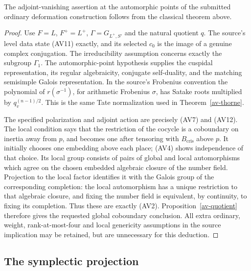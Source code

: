 \begin{corollary}\label{av-source}
The adjoint-vanishing assertion at the automorphic points of
the submitted ordinary deformation construction follows from
the classical theorem above.
\cite{alpo-uniform-source}
\end{corollary}
\begin{proof}
Use $F=L$, $F^+=L^+$, $\Gamma=G_{L^+,S'}$ and the
natural quotient $q$. The source's level data state (AV11)
exactly, and its selected $c_0$ is the image of a genuine
complex conjugation. The irreducibility assumption concerns
exactly the subgroup $\Gamma_1$. The automorphic-point
hypothesis supplies the cuspidal representation, its regular algebraicity,
conjugate self-duality, and the matching semisimple Galois
representation. In the source's Frobenius convention the
polynomial of $r(\sigma^{-1})$, for arithmetic Frobenius
$\sigma$, has Satake roots multiplied by
$q_v^{(n-1)/2}$. This is the same Tate normalization used
in Theorem~\ref{av-thorne}.

The specified polarization and adjoint action are precisely
(AV7) and (AV12). The local condition says that the
restriction of the cocycle is a coboundary on inertia away
from $p$, and becomes one after tensoring with
$B_{\mathrm{cris}}$ above $p$. It initially chooses one
embedding above each place; (AV4) shows independence of
that choice. Its local group consists of pairs of global
and local automorphisms which agree on the chosen embedded
algebraic closure of the number field. Projection to the
local factor identifies it with the Galois group of the
corresponding completion: the local automorphism has a
unique restriction to that algebraic closure, and fixing
the number field is equivalent, by continuity, to fixing
its completion. Thus these are exactly (AV2).
Proposition~\ref{av-quotient}
therefore gives the requested global coboundary conclusion.
All extra ordinary, weight, rank-at-most-four and local
genericity assumptions in the source implication may be
retained, but are unnecessary for this deduction.
\end{proof}

\subsection{The symplectic projection}

